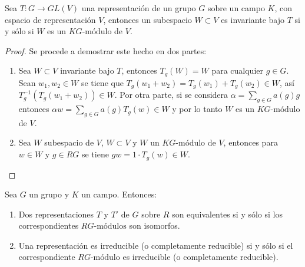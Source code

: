   \begin{lema}
  Sea $T \colon G \to GL(V)$ una representación de un grupo $G$ sobre un campo $K$, con espacio de representación $V$, entonces un subespacio $W \subset V$ es invariante bajo $T$ si y sólo si $W$ es un $KG\mbox{-módulo}$ de $V$. 
  \end{lema}
  
  \begin{proof}
  Se procede a demostrar este hecho en dos partes:
  \begin{enumerate}
  \item Sea $W \subset V$ invariante bajo $T$, entonces $T_{g}(W) = W$ para cualquier $g \in G$. Sean $w_1, w_2 \in W$ se tiene que $T_{g}(w_1 + w_2) = T_{g}(w_1) + T_{g}(w_2) \in W$, así $T_{g}^{-1}(T_{g}(w_1 + w_2)) \in W$. Por otra parte, si se considera $\alpha = \sum_{g \in G}a(g)g$ entonces $\alpha w = \sum_{g \in G}a(g)T_g(w) \in W$ y por lo tanto $W$ es un $KG\mbox{-módulo}$ de $V$.
  \item Sea $W$ subespacio de $V$, $W \subset V$ y $W$ un $KG\mbox{-módulo}$ de $V$, entonces para $w \in W$ y $g \in RG$ se tiene $gw = 1\cdot T_g(w) \in W$. \qedhere
  \end{enumerate} 
  \end{proof}
  
  \begin{teorema}
  Sea $G$ un grupo y $K$ un campo. Entonces:
  \begin{enumerate}
  \item Dos representaciones $T$ y $T'$ de $G$ sobre $R$ son equivalentes si y sólo si los correspondientes $RG\mbox{-módulos}$ son isomorfos.
  \item Una representación es irreducible (o completamente reducible) si y sólo si el correspondiente $RG\mbox{-módulo}$ es irreducible (o completamente reducible).
  \end{enumerate}
  \end{teorema}
  

